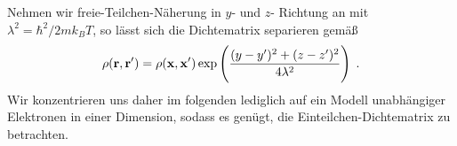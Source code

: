 Nehmen wir freie-Teilchen-Näherung in $y$- und $z$- Richtung an mit $\lambda^2 = \hbar^2/2mk_B T$, so lässt sich die Dichtematrix separieren \cite{grubin1993transport} gemäß
\begin{equation}
  \rho(\vb{r},\vb{r}') = \rho(\vb{x},\vb{x}') \exp\left( \frac{(y-y')^2 + (z-z')^2}{4\lambda^2}\right) \; .
\end{equation}
Wir konzentrieren uns daher im folgenden lediglich auf ein Modell unabhängiger Elektronen in einer Dimension, sodass es genügt, die Einteilchen-Dichtematrix zu betrachten.





